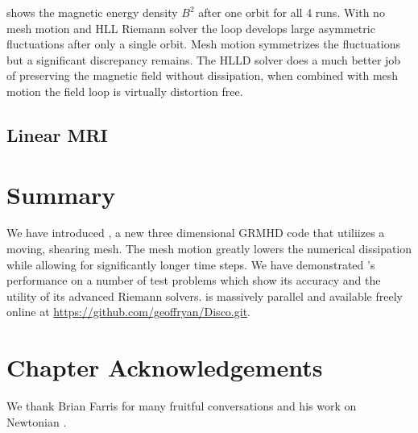  shows the magnetic energy density $B^2$ after one orbit for all 4 runs.  With no mesh motion and HLL Riemann solver the loop develops large asymmetric fluctuations after only a single orbit.  Mesh motion symmetrizes the fluctuations but a significant discrepancy remains.  The HLLD solver does a much better job of preserving the magnetic field without dissipation, when combined with mesh motion the field loop is virtually distortion free.

\subsection{Linear MRI}


\section{Summary}

We have introduced \grdisco, a new three dimensional GRMHD code that utiliizes a moving, shearing mesh.  The mesh motion greatly lowers the numerical dissipation while allowing for significantly longer time steps.  We have demonstrated \grdisco's performance on a number of test problems which show its accuracy and the utility of its advanced Riemann solvers.  \grdisco is massively parallel and available freely online at \url{https://github.com/geoffryan/Disco.git}.

\section{Chapter Acknowledgements} 

We thank Brian Farris for many fruitful conversations and his work on Newtonian \disco.  

